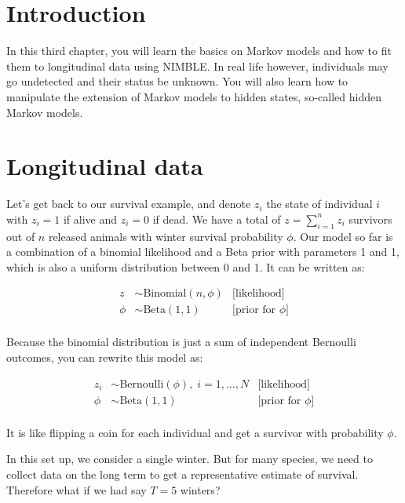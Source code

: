 \documentclass[
  12pt,
]{krantz}
\begin{document}
\section{Introduction}\label{introduction-3}

In this third chapter, you will learn the basics on Markov models and how to fit them to longitudinal data using NIMBLE. In real life however, individuals may go undetected and their status be unknown. You will also learn how to manipulate the extension of Markov models to hidden states, so-called hidden Markov models.

\section{Longitudinal data}\label{longitudinal-data}

Let's get back to our survival example, and denote \(z_i\) the state of individual \(i\) with \(z_i = 1\) if alive and \(z_i = 0\) if dead. We have a total of \(z = \displaystyle{\sum_{i=1}^{n}{z_i}}\) survivors out of \(n\) released animals with winter survival probability \(\phi\). Our model so far is a combination of a binomial likelihood and a Beta prior with parameters 1 and 1, which is also a uniform distribution between 0 and 1. It can be written as:

\begin{align*}
   z &\sim \text{Binomial}(n, \phi) &\text{[likelihood]}
   \\
  \phi &\sim \text{Beta}(1, 1) &\text{[prior for }\phi \text{]} \\
\end{align*}

Because the binomial distribution is just a sum of independent Bernoulli outcomes, you can rewrite this model as:

\begin{align*}
   z_i &\sim \text{Bernoulli}(\phi), \; i = 1, \ldots, N &\text{[likelihood]}
   \\
  \phi &\sim \text{Beta}(1, 1) &\text{[prior for }\phi \text{]} \\
\end{align*}

It is like flipping a coin for each individual and get a survivor with probability \(\phi\).

In this set up, we consider a single winter. But for many species, we need to collect data on the long term to get a representative estimate of survival. Therefore what if we had say \(T = 5\) winters?
\end{document}
